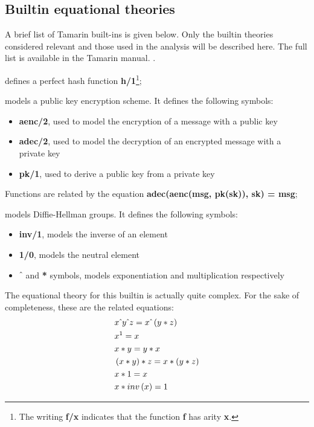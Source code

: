 \subsection{Builtin equational theories}
\label{sub:Builtin-equational-theories}
A brief list of Tamarin built-ins is given below. Only the builtin theories considered relevant and those used in the analysis will be described here. The full list is available in the Tamarin manual. \cite{TamarinProverManual}.

\begin{description}[style=nextline]
    \item[hashing] defines a perfect hash function \textbf{h/1}\footnote{The writing \textbf{f/x} indicates that the function \textbf{f} has arity \textbf{x}.};
    \item[asymmetric-encryption] models a public key encryption scheme. It defines the following symbols:
    
    \begin{itemize}
        \item{\textbf{aenc/2}, used to model the encryption of a message with a public key}
        \item{\textbf{adec/2}, used to model the decryption of an encrypted message with a private key}
        \item{\textbf{pk/1}, used to derive a public key from a private key}
    \end{itemize}

    Functions are related by the equation \textbf{adec(aenc(msg, pk(sk)), sk) = msg};

    \item[diffie-hellman] models Diffie-Hellman groups. It defines the following symbols:
    
    \begin{itemize}
        \item{\textbf{inv/1}, models the inverse of an element}
        \item{\textbf{1/0}, models the neutral element}
        \item{\textbf{$\hat{\mkern6mu}$} and \textbf{*} symbols, models exponentiation and multiplication respectively}
    \end{itemize}

    The equational theory for this builtin is actually quite complex. For the sake of completeness, these are the related equations:
    \begin{equation}
    \begin{aligned}
        &x \hat{\mkern6mu} y \hat{\mkern6mu} z = x \hat{\mkern6mu} \left(y * z\right) \\
        &x ^ 1 = x \\
        &x * y = y * x \\
        &\left(x * y\right) * z = x * \left(y * z\right) \\
        &x * 1 = x \\
        &x * inv\left(x\right) = 1
    \end{aligned}
    \end{equation}
\end{description}

